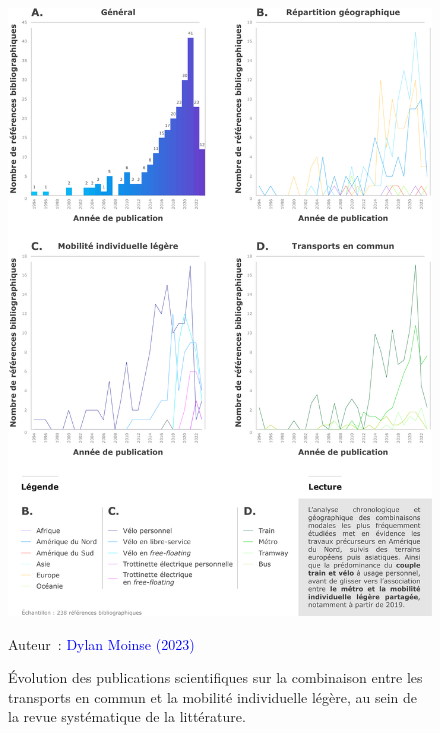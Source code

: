 \begin{refsegment}
    \begin{figure}[h!]\vspace*{4pt}
        \caption{Évolution des publications scientifiques sur la combinaison entre les transports en commun et la mobilité individuelle légère, au sein de la revue systématique de la littérature.}
        \label{fig-chap2:chronologie-modes-deplacements-rsl}
        \centerline{\includegraphics[width=1\columnwidth]{src/Figures/Chap-2/FR_RSL_Chronologie.pdf}}
        \vspace{5pt}
        \begin{flushright}\scriptsize{
        Auteur~: \textcolor{blue}{Dylan Moinse (2023)}
        }\end{flushright}
    \end{figure}


\end{refsegment}
